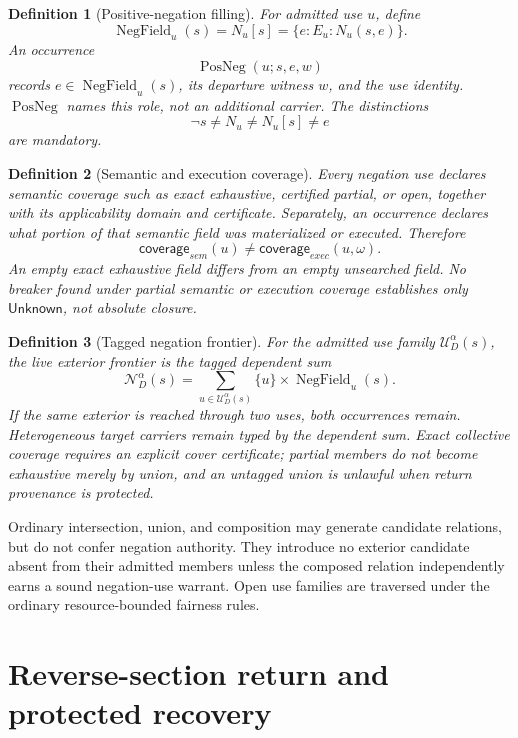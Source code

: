 \documentclass[11pt,oneside]{article}
\newtheorem{definition}{Definition}[section]
\newcommand{\NegField}{\operatorname{NegField}}
\newcommand{\PosNeg}{\operatorname{PosNeg}}
\begin{document}
\begin{definition}[Positive-negation filling]\label{def:positive-negation}
For admitted use \(u\), define
\[
\NegField_u(s)=N_u[s]=\{e:E_u:N_u(s,e)\}.
\]
An occurrence
\[
\boxed{\PosNeg(u;s,e,w)}
\]
records \(e\in\NegField_u(s)\), its departure witness \(w\), and the use identity.  \(\PosNeg\) names this role, not an additional carrier.  The distinctions
\[
\neg s\neq N_u\neq N_u[s]\neq e
\]
are mandatory.
\end{definition}

\begin{definition}[Semantic and execution coverage]\label{def:negation-coverage}
Every negation use declares semantic coverage such as exact exhaustive, certified partial, or open, together with its applicability domain and certificate.  Separately, an occurrence declares what portion of that semantic field was materialized or executed.  Therefore
\[
\boxed{\mathsf{coverage}_{sem}(u)\neq\mathsf{coverage}_{exec}(u,\omega).}
\]
An empty exact exhaustive field differs from an empty unsearched field.  No breaker found under partial semantic or execution coverage establishes only \(\mathsf{Unknown}\), not absolute closure.
\end{definition}

\begin{definition}[Tagged negation frontier]\label{def:negation-frontier}
For the admitted use family \(\mathcal U_D^\alpha(s)\), the live exterior frontier is the tagged dependent sum
\[
\boxed{
\mathcal N_D^\alpha(s)
=
\sum_{u\in\mathcal U_D^\alpha(s)}
\{u\}\times\NegField_u(s).
}
\]
If the same exterior is reached through two uses, both occurrences remain.  Heterogeneous target carriers remain typed by the dependent sum.  Exact collective coverage requires an explicit cover certificate; partial members do not become exhaustive merely by union, and an untagged union is unlawful when return provenance is protected.
\end{definition}

Ordinary intersection, union, and composition may generate candidate relations, but do not confer negation authority.  They introduce no exterior candidate absent from their admitted members unless the composed relation independently earns a sound negation-use warrant.  Open use families are traversed under the ordinary resource-bounded fairness rules.

\section{Reverse-section return and protected recovery}
\end{document}
